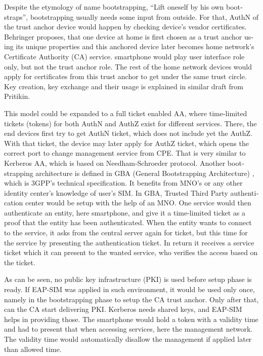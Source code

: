 \documentclass[12pt,a4paper,english]{tutthesis}
\begin{document}
\begin{otherlanguage}{english}
Despite the etymology of name bootstrapping, ``Lift oneself by his own
bootstraps'', bootstrapping usually needs some input from outside.
For that, AuthN of the trust anchor device would happen by checking
device's vendor certificates. 
Behringer \cite{draft-behringer-bootstrap} proposes, that one device
at home is first chosen as a trust anchor  using its unique properties 
and this anchored device later becomes home
network's Certificate Authority (CA) service. smartphone would play
user interface role only, but not the trust anchor role.
The rest of the home network devices would apply for
certificates from this trust anchor to get under the same trust circle.  Key creation,
key exchange and their usage is explained in similar draft from
Pritikin\cite{draft-pritikin-bootstrap}. 


This model could be expanded to a full ticket enabled 
AA, where time-limited tickets (tokens) for both
AuthN and AuthZ exist for different services.
There, the end devices  first try to get AuthN ticket, which 
does not include yet the AuthZ.
With that ticket, the device may later apply for AuthZ ticket, which
opens the correct port to change management service from CPE.
That is very similar to Kerberos AA, which is based on
Needham-Schroeder protocol.
Another bootstrapping architecture is 
defined in GBA (General Bootstrapping Architecture) \cite{gba2014}, which 
is 3GPP's technical specification. 
It benefits from MNO's or any other identity center's  knowledge of user's SIM.
In GBA, Trusted Third Party authentication center would be setup with
the help of an MNO.
One service would then authenticate an entity, here smartphone, and
give it a time-limited ticket as a proof that the entity has been authenticated.
When the entity wants to connect to the service, it asks from the central 
server again for ticket, but this time for the service by presenting
the authentication ticket. In return it receives a service ticket which
it can present to the wanted service, who verifies the access based
on the ticket. 



As can be seen, no public key infrastructure (PKI) is used before
setup phase is ready.  If EAP-SIM was applied in such environment, it
would be used only once, namely in the bootstrapping phase to setup
the CA trust anchor.  Only after that, can the CA start delivering
PKI. Kerberos needs shared keys, and EAP-SIM helps in providing those.
The smartphone would hold a token with a validity time and had to
present that when accessing services, here the management network. The
validity time would automatically disallow the management if applied
later than allowed time.



\end{otherlanguage}
\end{document}
